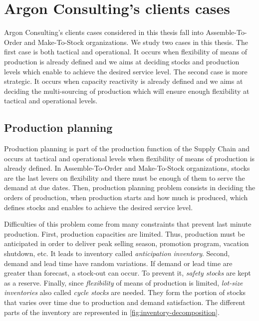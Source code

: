 

\section{Argon Consulting's clients cases}


Argon Consulting's clients cases considered in this thesis fall into Assemble-To-Order and Make-To-Stock organizations.
We study two cases in this thesis.
The first case is both tactical and operational.
It occurs when flexibility of means of production is already defined and we aims at deciding stocks and production levels which enable to achieve the desired service level.
The second case is more strategic.
It occurs when capacity reactivity is already defined and we aims at deciding the multi-sourcing of production which will ensure enough flexibility at tactical and operational levels.


\subsection{Production planning}
\label{sec:business-context:argon:pdp}


Production planning is part of the production function of the Supply Chain and occurs at tactical and operational levels when flexibility of means of production is already defined.
In Assemble-To-Order and Make-To-Stock organizations, stocks are the last levers on flexibility and there must be enough of them to serve the demand at due dates.
Then, production planning problem consists in deciding the orders of production, \ie when production starts and how much is produced, which defines stocks and enables to achieve the desired service level.


Difficulties of this problem come from many constraints that prevent last minute production.
First, production capacities are limited.
Thus, production must be anticipated in order to deliver peak selling season, promotion program, vacation shutdown, etc.
It leads to inventory called \emph{anticipation inventory}.
Second, demand and lead time have random variations.
If demand or lead time are greater than forecast, a stock-out can occur.
To prevent it, \emph{safety stocks} are kept as a reserve.
Finally, since \emph{flexibility} of means of production is limited, \emph{lot-size inventories} also called \emph{cycle stocks} are needed.
They form the portion of stocks that varies over time due to production and demand satisfaction.
The different parts of the inventory are represented in \cref{fig:inventory-decomposition}.


